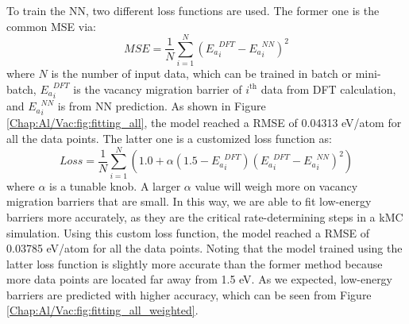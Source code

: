 To train the \ac{NN}, two different loss functions are used. The former one is the common \acf{MSE} via:
\begin{equation}
MSE = \frac{1}{N}\sum_{i=1}^{N}({E_a}_{i}^{DFT} - {E_a}_{i}^{NN})^2
\label{Chap:Al/Vac:eq:MSE}
\end{equation}
where $N$ is the number of input data, which can be trained in batch or mini-batch, ${E_a}_i^{DFT}$ is the vacancy migration barrier of $i^{\text{th}}$ data from \ac{DFT} calculation, and ${E_a}_{i}^{NN}$ is from \ac{NN} prediction. As shown in Figure \ref{Chap:Al/Vac:fig:fitting_all}, the model reached a \ac{RMSE} of 0.04313 eV/atom for all the data points. The latter one is a customized loss function as:
\begin{equation}
Loss = \frac{1}{N}\sum_{i=1}^{N}{(1.0 + \alpha (1.5 - {E_a}_{i}^{DFT})({E_a}_{i}^{DFT} - {E_a}_{i}^{NN})^2)}
\label{Chap:Al/Vac:eq:custLoss}
\end{equation}
where $\alpha$ is a tunable knob. A larger $\alpha$ value will weigh more on vacancy migration barriers that are small. In this way, we are able to fit low-energy barriers more accurately, as they are the critical rate-determining steps in a \ac{kMC} simulation. Using this custom loss function, the model reached a \ac{RMSE} of 0.03785 eV/atom for all the data points. Noting that the model trained using the latter loss function is slightly more accurate than the former method because more data points are located far away from 1.5 eV. As we expected, low-energy barriers are predicted with higher accuracy, which can be seen from Figure \ref{Chap:Al/Vac:fig:fitting_all_weighted}.


